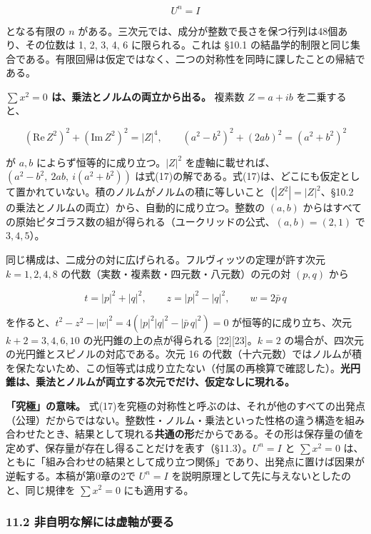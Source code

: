 \documentclass[
  a4paper,
]{ltjsarticle}
\begin{document}
\[
U^n=I
\tag{17a}
\]

となる有限の \(n\)
がある。三次元では、成分が整数で長さを保つ行列は48個あり、その位数は 1,
2, 3, 4, 6 に限られる。これは §10.1
の結晶学的制限と同じ集合である。有限回帰は仮定ではなく、二つの対称性を同時に課したことの帰結である。

\textbf{\(\sum x^2=0\) は、乗法とノルムの両立から出る。} 複素数
\(Z=a+ib\) を二乗すると、

\[
(\mathrm{Re}\,Z^2)^2+(\mathrm{Im}\,Z^2)^2=|Z|^4,
\qquad
(a^2-b^2)^2+(2ab)^2=(a^2+b^2)^2
\tag{17b}
\]

が \(a,b\) によらず恒等的に成り立つ。\(|Z|^2\)
を虚軸に載せれば、\((a^2-b^2,\ 2ab,\ i(a^2+b^2))\)
は式(17)の解である。式(17)は、どこにも仮定として置かれていない。積のノルムがノルムの積に等しいこと（\(|Z^2|=|Z|^2\)、§10.2
の乗法とノルムの両立）から、自動的に成り立つ。整数の \((a,b)\)
からはすべての原始ピタゴラス数の組が得られる（ユークリッドの公式、\((a,b)=(2,1)\)
で \(3,4,5\)）。

同じ構成は、二成分の対に広げられる。フルヴィッツの定理が許す次元
\(k=1,2,4,8\) の代数（実数・複素数・四元数・八元数）の元の対 \((p,q)\)
から

\[
t=|p|^2+|q|^2,\qquad z=|p|^2-|q|^2,\qquad w=2\bar p\,q
\tag{17c}
\]

を作ると、\(t^2-z^2-|w|^2=4\left(|p|^2|q|^2-|\bar p\,q|^2\right)=0\)
が恒等的に成り立ち、次元 \(k+2=3,4,6,10\) の光円錐の上の点が得られる
{[}22{]}{[}23{]}。\(k=2\)
の場合が、四次元の光円錐とスピノルの対応である。次元 16
の代数（十六元数）ではノルムが積を保たないため、この恒等式は成り立たない（付属の再検算で確認した）。\textbf{光円錐は、乗法とノルムが両立する次元でだけ、仮定なしに現れる。}

\textbf{「究極」の意味。}
式(17)を究極の対称性と呼ぶのは、それが他のすべての出発点（公理）だからではない。整数性・ノルム・乗法といった性格の違う構造を組み合わせたとき、結果として現れる\textbf{共通の形}だからである。その形は保存量の値を定めず、保存量が存在し得ることだけを表す（§11.3）。\(U^n=I\)
と \(\sum x^2=0\)
は、ともに「組み合わせの結果として成り立つ関係」であり、出発点に置けば因果が逆転する。本稿が第0章の2で
\(U^n=I\) を説明原理として先に与えないとしたのと、同じ規律を
\(\sum x^2=0\) にも適用する。

\subsubsection{11.2
非自明な解には虚軸が要る}\label{ux975eux81eaux660eux306aux89e3ux306bux306fux865aux8ef8ux304cux8981ux308b}
\end{document}
